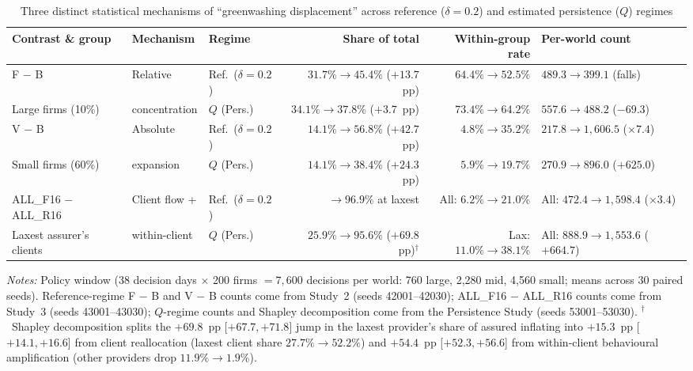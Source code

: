 \documentclass[11pt]{article}
\begin{document}
\begin{table}[t]
\centering
\scriptsize
\begin{threeparttable}
\caption{Three distinct statistical mechanisms of ``greenwashing displacement'' across reference ($\delta = 0.2$) and estimated persistence ($Q$) regimes}
\label{tab:displacement}
\setlength{\tabcolsep}{2.8pt}
\begin{tabular}{@{}>{\raggedright\arraybackslash}p{2.35cm}>{\raggedright\arraybackslash}p{1.55cm}>{\raggedright\arraybackslash}p{1.45cm}rrl@{}}
\toprule
Contrast \& group & Mechanism & Regime & Share of total & Within-group rate & Per-world count \\
\midrule
F $-$ B & Relative & Ref.\ ($\delta{=}0.2$) & $31.7\% \to 45.4\%$ ($+13.7$~pp) & $64.4\% \to 52.5\%$ & $489.3 \to 399.1$ (falls) \\
Large firms (10\%) & concentration & $Q$ (Pers.) & $34.1\% \to 37.8\%$ ($+3.7$~pp) & $73.4\% \to 64.2\%$ & $557.6 \to 488.2$ ($-69.3$) \\
\midrule
V $-$ B & Absolute & Ref.\ ($\delta{=}0.2$) & $14.1\% \to 56.8\%$ ($+42.7$~pp) & $4.8\% \to 35.2\%$ & $217.8 \to 1{,}606.5$ ($\times 7.4$) \\
Small firms (60\%) & expansion & $Q$ (Pers.) & $14.1\% \to 38.4\%$ ($+24.3$~pp) & $5.9\% \to 19.7\%$ & $270.9 \to 896.0$ ($+625.0$) \\
\midrule
ALL\_F16 $-$ ALL\_R16 & Client flow + & Ref.\ ($\delta{=}0.2$) & $\to 96.9\%$ at laxest & All: $6.2\% \to 21.0\%$ & All: $472.4 \to 1{,}598.4$ ($\times 3.4$) \\
Laxest assurer's clients & within-client & $Q$ (Pers.) & $25.9\% \to 95.6\%$ ($+69.8$~pp)$^\dagger$ & Lax: $11.0\% \to 38.1\%$ & All: $888.9 \to 1{,}553.6$ ($+664.7$) \\
\bottomrule
\end{tabular}
\begin{tablenotes}[flushleft]\footnotesize
\item \textit{Notes:} Policy window (38 decision days $\times$ 200 firms $= 7{,}600$ decisions per world: 760 large, 2,280 mid, 4,560 small; means across 30 paired seeds). Reference-regime F $-$ B and V $-$ B counts come from Study~2 (seeds 42001--42030); ALL\_F16 $-$ ALL\_R16 counts come from Study~3 (seeds 43001--43030); $Q$-regime counts and Shapley decomposition come from the Persistence Study (seeds 53001--53030). $^\dagger$~Shapley decomposition splits the $+69.8$~pp [$+67.7, +71.8$] jump in the laxest provider's share of assured inflating into $+15.3$~pp [$+14.1, +16.6$] from client reallocation (laxest client share $27.7\% \to 52.2\%$) and $+54.4$~pp [$+52.3, +56.6$] from within-client behavioural amplification (other providers drop $11.9\% \to 1.9\%$).
\end{tablenotes}
\end{threeparttable}
\end{table}
\end{document}
